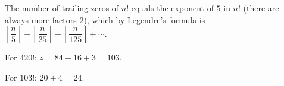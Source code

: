 The number of trailing zeros of $n!$ equals the exponent of $5$ in $n!$ (there are always more factors $2$), which by Legendre's formula is $\left\lfloor\dfrac {n}{5}\right\rfloor+\left\lfloor\dfrac {n}{25}\right\rfloor+\left\lfloor\dfrac {n}{125}\right\rfloor+\cdots$.

For $420!$: $z=84+16+3=103$.

For $103!$: $20+4=\boxed{24}$.
